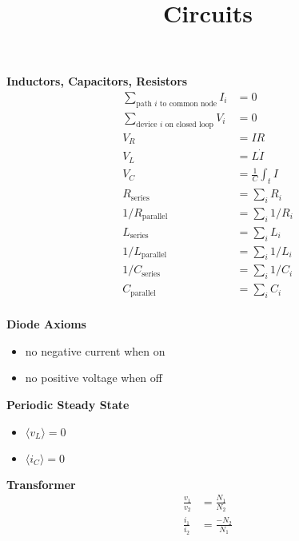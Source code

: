 \documentclass[12pt]{article}
\title{\vspace{-2em}Circuits}
\date{}
\begin{document}
\maketitle

\vspace{-4em}
\begin{multicols}{2}
  \textbf{Inductors, Capacitors, Resistors}
  \begin{align}
    \sum_{\textrm{path $i$ to common node}} I_i &= 0\\
    \sum_{\textrm{device $i$ on closed loop}} V_i &= 0\\
    V_R &= I R\\
    V_L &= L \dot{I}\\
    V_C &= \frac{1}{C} \int_t I\\
    R_{\textrm{series}} &= \sum_i R_i\\
    1/R_{\textrm{parallel}} &= \sum_i 1/R_i\\
    L_{\textrm{series}} &= \sum_i L_i\\
    1/L_{\textrm{parallel}} &= \sum_i 1/L_i\\
    1/C_{\textrm{series}} &= \sum_i 1/C_i\\
    C_{\textrm{parallel}} &= \sum_i C_i\\
  \end{align}

  \textbf{Diode Axioms}
  \begin{itemize}
  \item no negative current when on
  \item no positive voltage when off
  \end{itemize}

  \textbf{Periodic Steady State}
  \begin{itemize}
    \item $\langle v_L \rangle = 0$
    \item $\langle i_C \rangle = 0$
  \end{itemize}

  \textbf{Transformer}
  \begin{align}
    \frac{v_1}{v_2} &= \frac{N_1}{N_2}\\ %
    \frac{i_1}{i_2} &= \frac{-N_2}{N_1} %
  \end{align}


\end{multicols}
\end{document}
